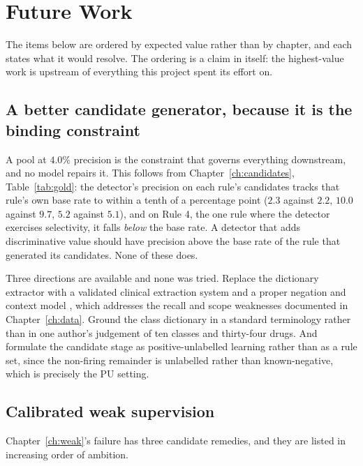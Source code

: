 \section{Future Work}
\label{sec:disc-future}

The items below are ordered by expected value rather than by chapter, and each
states what it would resolve. The ordering is a claim in itself: the highest-value
work is upstream of everything this project spent its effort on.

\subsection{A better candidate generator, because it is the binding constraint}

A pool at $4.0\%$ precision is the constraint that governs everything
downstream, and no model repairs it. This follows from
Chapter~\ref{ch:candidates}, Table~\ref{tab:gold}: the detector's precision on
each rule's candidates tracks that rule's own base rate to within a tenth of a
percentage point ($2.3$ against $2.2$, $10.0$ against $9.7$, $5.2$ against
$5.1$), and on Rule 4, the one rule where the detector exercises selectivity, it
falls \emph{below} the base rate. A detector that adds discriminative value
should have precision above the base rate of the rule that generated its
candidates. None of these does.

Three directions are available and none was tried. Replace the dictionary
extractor with a validated clinical extraction system
\citep{henry2020n2c2,neumann2019scispacy,eyre2021medspacy} and a proper negation
and context model \citep{chapman2001negex}, which addresses the recall and scope
weaknesses documented in Chapter~\ref{ch:data}. Ground the class dictionary in a
standard terminology rather than in one author's judgement of ten classes and
thirty-four drugs. And formulate the candidate stage as positive-unlabelled
learning \citep{bekker2020pu} rather than as a rule set, since the non-firing
remainder is unlabelled rather than known-negative, which is precisely the PU
setting.

\subsection{Calibrated weak supervision}

Chapter~\ref{ch:weak}'s failure has three candidate remedies, and they are
listed in increasing order of ambition.

